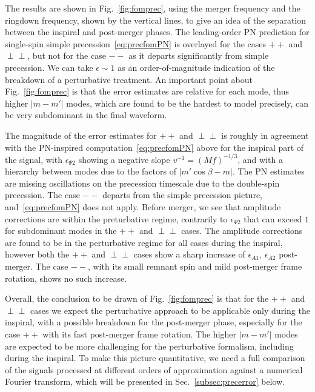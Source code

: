 \documentclass[aps,showpacs,twocolumn,
prd,superscriptaddress,nofootinbib]{revtex4-1}
\begin{document}
The results are shown in Fig.~\ref{fig:fomprec}, using the merger frequency and the ringdown frequency, shown by the vertical lines, to give an idea of the separation between the inspiral and post-merger phases. The leading-order PN prediction for single-spin simple precession~\eqref{eq:precfomPN} is overlayed for the cases $++$ and $\perp\perp$, but not for the case $--$ as it departs significantly from simple precession. We can take $\epsilon \sim 1$ as an order-of-magnitude indication of the breakdown of a perturbative treatment. An important point about Fig.~\ref{fig:fomprec} is that the error estimates are relative for each mode, thus higher $|m-m'|$ modes, which are found to be the hardest to model precisely, can be very subdominant in the final waveform. 

The magnitude of the error estimates for $++$ and $\perp\perp$ is roughly in agreement with the PN-inspired computation~\eqref{eq:precfomPN} above for the inspiral part of the signal, with $\epsilon_{\Psi 2}$ showing a negative slope $v^{-1}=(Mf)^{-1/3}$, and with a hierarchy between modes due to the factors of $|m' \cos \beta - m|$. The PN estimates are missing oscillations on the precession timescale due to the double-spin precession. The case $--$ departs from the simple precession picture, and~\eqref{eq:precfomPN} does not apply. Before merger, we see that amplitude corrections are within the preturbative regime, contrarily to $\epsilon_{\Psi 2}$ that can exceed $1$ for subdominant modes in the $++$ and $\perp\perp$ cases. The amplitude corrections are found to be in the perturbative regime for all cases during the inspiral, however both the $++$ and $\perp\perp$ cases show a sharp increase of $\epsilon_{A1}$, $\epsilon_{A2}$ post-merger. The case $--$, with its small remnant spin and mild post-merger frame rotation, shows no such increase.

Overall, the conclusion to be drawn of Fig.~\ref{fig:fomprec} is that for the $++$ and $\perp\perp$ cases we expect the perturbative approach to be applicable only during the inspiral, with a possible breakdown for the post-merger phase, especially for the case $++$ with its fast post-merger frame rotation. The higher $|m-m'|$ modes are expected to be more challenging for the perturbative formalism, including during the inspiral. To make this picture quantitative, we need a full comparison of the signals processed at different orders of approximation against a numerical Fourier transform, which will be presented in Sec.~\ref{subsec:precerror} below.
\end{document}
